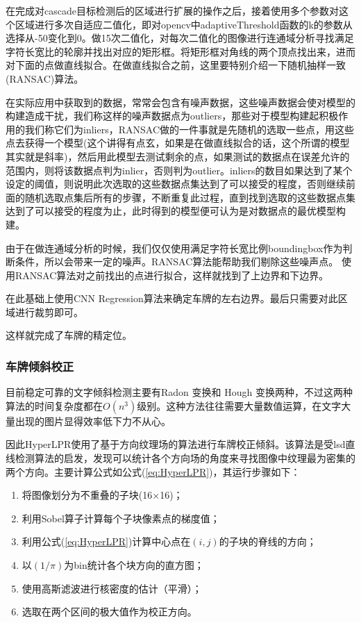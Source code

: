 在完成对cascade目标检测后的区域进行扩展的操作之后，接着使用多个参数对这个区域进行多次自适应二值化，即对opencv中adaptiveThreshold函数的k的参数从选择从-50变化到0。做15次二值化，对每次二值化的图像进行连通域分析寻找满足字符长宽比的轮廓并找出对应的矩形框。将矩形框对角线的两个顶点找出来，进而对下面的点做直线拟合。在做直线拟合之前，这里要特别介绍一下随机抽样一致(RANSAC)算法。

在实际应用中获取到的数据，常常会包含有噪声数据，这些噪声数据会使对模型的构建造成干扰，我们称这样的噪声数据点为outliers，那些对于模型构建起积极作用的我们称它们为inliers，RANSAC做的一件事就是先随机的选取一些点，用这些点去获得一个模型(这个讲得有点玄，如果是在做直线拟合的话，这个所谓的模型其实就是斜率)，然后用此模型去测试剩余的点，如果测试的数据点在误差允许的范围内，则将该数据点判为inlier，否则判为outlier。inliers的数目如果达到了某个设定的阈值，则说明此次选取的这些数据点集达到了可以接受的程度，否则继续前面的随机选取点集后所有的步骤，不断重复此过程，直到找到选取的这些数据点集达到了可以接受的程度为止，此时得到的模型便可认为是对数据点的最优模型构建。

由于在做连通域分析的时候，我们仅仅使用满足字符长宽比例boundingbox作为判断条件，所以会带来一定的噪声。RANSAC算法能帮助我们剔除这些噪声点。
使用RANSAC算法对之前找出的点进行拟合，这样就找到了上边界和下边界。

在此基础上使用CNN Regression算法来确定车牌的左右边界。最后只需要对此区域进行裁剪即可。

这样就完成了车牌的精定位。

\subsubsection{车牌倾斜校正}
目前稳定可靠的文字倾斜检测主要有Radon 变换和 Hough 变换两种，不过这两种算法的时间复杂度都在$O(n^3)$级别。这种方法往往需要大量数值运算，在文字大量出现的图片显得效率低下力不从心。

因此HyperLPR使用了基于方向纹理场的算法进行车牌校正倾斜。该算法是受lsd直线检测算法的启发，发现可以统计各个方向场的角度来寻找图像中纹理最为密集的两个方向。主要计算公式如公式(\ref{eq:HyperLPR})，其运行步骤如下：
\begin{enumerate}
	\item 将图像划分为不重叠的子块(16×16)；
	\item 利用Sobel算子计算每个子块像素点的梯度值；
	\item 利用公式(\ref{eq:HyperLPR})计算中心点在$(i,j)$的子块的脊线的方向；
	\item 以$(1/\pi)$为bin统计各个块方向的直方图；
	\item 使用高斯滤波进行核密度的估计（平滑）；
	\item 选取在两个区间的极大值作为校正方向。
\end{enumerate}

